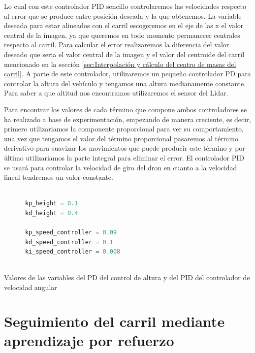   Lo cual con este controlador PID sencillo controlaremos las velocidades respecto al error que se produce entre posición deseada y la que obtenemos. La variable deseada para estar alineados con el carril escogeremos 
  en el eje de las x el valor central de la imagen, ya que queremos en todo momento permanecer centrales respecto al carril. Para calcular el error realizaremos la diferencia del valor deseado que seria 
  el valor central de la imagen y el valor del centroide del carril mencionado en la sección \ref{sec:Interpolación y cálculo del centro de masas del carril}. 
  A parte de este controlador, utilizaremos un pequeño controlador PD para controlar la altura del vehículo y tengamos una altura medianamente constante. Para saber a que altitud nos encontramos utilizaremos el sensor del Lidar. \newline

  Para encontrar los valores de cada término que compone ambos controladores se ha realizado a base de experimentación, empezando de manera creciente, es decir, primero utilizariamos
  la componente proporcional para ver su comportamiento, una vez que tengamos el valor del término proporcional pasaremos al término derivativo para suavizar los movimientos que puede
  producir este término y por último utilizariamos la parte integral para eliminar el error. El controlador PID se usará para controlar la velocidad de giro del dron en cuanto a la velocidad lineal 
  tendremos un valor constante. \newline

  \begin{code}[h]
    \begin{lstlisting}[language=Python]

      kp_height = 0.1
      kd_height = 0.4

      kp_speed_controller = 0.09
      kd_speed_controller = 0.1
      ki_speed_controller = 0.008
     
    \end{lstlisting}
    \caption[Valores de las variables del PD del control de altura y del PID del controlador de velocidad angular]{Valores de las variables del PD del control de altura y del PID del controlador de velocidad angular}
    \label{cod:codejemplo}
    \end{code} 

  \section{Seguimiento del carril mediante aprendizaje por refuerzo}
  \label{sec:Reinforcement learning}


